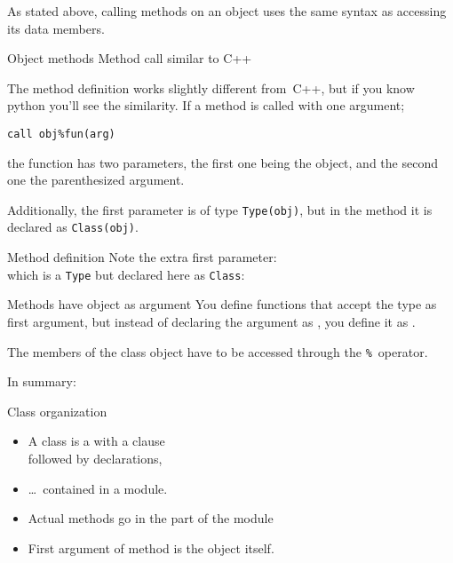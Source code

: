 As stated above, calling methods on an object
uses the same syntax as accessing its data members.

\begin{block}{Object methods}
  \label{sl:fclass-prog}
  Method call similar to C++
  \footnotesize
\end{block}

The method definition works slightly different from~C++,
but if you know python you'll see the similarity.
If a method is called with one argument;
\begin{lstlisting}
call obj%fun(arg)
\end{lstlisting}
the function has two parameters,
the first one being the object,
and the second one the parenthesized argument.

Additionally, the first parameter is of type
\lstinline+Type(obj)+, but in the method
it is declared as \lstinline+Class(obj)+.

\begin{block}{Method definition}
  \label{sl:fclass-method}
  Note the extra first parameter:\\
  which is a \lstinline+Type+ but declared
  here as \lstinline+Class+:
\end{block}

\begin{slide}{Methods have object as argument}
  \label{sl:fclass-self}
  You define functions that accept the type as first argument, but
  instead of declaring the argument as , you define it as
  .

  The members of the class object have to be accessed through the
  \verb+%+~operator.
\end{slide}

In summary:

\begin{block}{Class organization}
  \label{sl:fclass-org}
  \begin{itemize}
  \item A class is a  with a  clause\\
    followed by  declarations,
  \item \ldots~contained in a module.
  \item Actual methods go in the  part of the module
  \item First argument of method is the object itself.
  \end{itemize}
\end{block}


